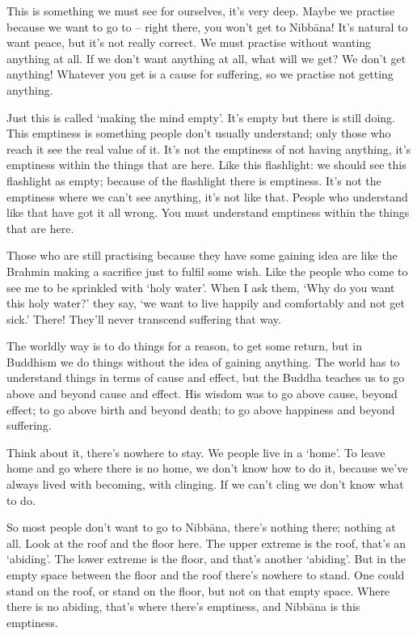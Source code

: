 This is something we must see for ourselves, it's very deep. Maybe we practise because we want to go to  -- right there, you won't get to Nibb\=ana! It's natural to want peace, but it's not really correct. We must practise without wanting anything at all. If we don't want anything at all, what will we get? We don't get anything! Whatever you get is a cause for suffering, so we practise not getting anything.

Just this is called `making the mind empty'. It's empty but there is still doing. This emptiness is something people don't usually understand; only those who reach it see the real value of it. It's not the emptiness of not having anything, it's emptiness within the things that are here. Like this flashlight: we should see this flashlight as empty; because of the flashlight there is emptiness. It's not the emptiness where we can't see anything, it's not like that. People who understand like that have got it all wrong. You must understand emptiness within the things that are here.

Those who are still practising because they have some gaining idea are like the Brahmin making a sacrifice just to fulfil some wish. Like the people who come to see me to be sprinkled with `holy water'. When I ask them, `Why do you want this holy water?' they say, `we want to live happily and comfortably and not get sick.' There! They'll never transcend suffering that way.

The worldly way is to do things for a reason, to get some return, but in Buddhism we do things without the idea of gaining anything. The world has to understand things in terms of cause and effect, but the Buddha teaches us to go above and beyond cause and effect. His wisdom was to go above cause, beyond effect; to go above birth and beyond death; to go above happiness and beyond suffering.

Think about it, there's nowhere to stay. We people live in a `home'. To leave home and go where there is no home, we don't know how to do it, because we've always lived with becoming, with clinging. If we can't cling we don't know what to do.

So most people don't want to go to Nibb\=ana, there's nothing there; nothing at all. Look at the roof and the floor here. The upper extreme is the roof, that's an `abiding'. The lower extreme is the floor, and that's another `abiding'. But in the empty space between the floor and the roof there's nowhere to stand. One could stand on the roof, or stand on the floor, but not on that empty space. Where there is no abiding, that's where there's emptiness, and Nibb\=ana is this emptiness.

